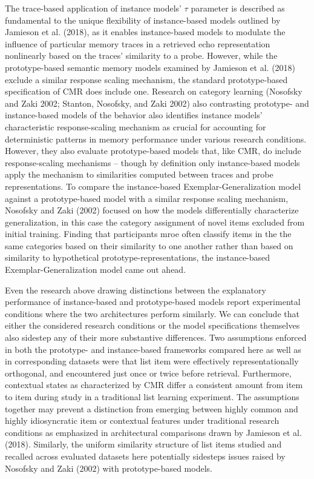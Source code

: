 \documentclass[
  letterpaper,
  DIV=11]{article}
\begin{document}
The trace-based application of instance models' \(\tau\) parameter is
described as fundamental to the unique flexibility of instance-based
models outlined by Jamieson et al. (2018), as it enables instance-based
models to modulate the influence of particular memory traces in a
retrieved echo representation nonlinearly based on the traces'
similarity to a probe. However, while the prototype-based semantic
memory models examined by Jamieson et al. (2018) exclude a similar
response scaling mechanism, the standard prototype-based specification
of CMR does include one. Research on category learning (Nosofsky and
Zaki 2002; Stanton, Nosofsky, and Zaki 2002) also contrasting prototype-
and instance-based models of the behavior also identifies instance
models' characteristic response-scaling mechanism as crucial for
accounting for deterministic patterns in memory performance under
various research conditions. However, they also evaluate prototype-based
models that, like CMR, do include response-scaling mechanisms -- though
by definition only instance-based models apply the mechanism to
similarities computed between traces and probe representations. To
compare the instance-based Exemplar-Generalization model against a
prototype-based model with a similar response scaling mechanism,
Nosofsky and Zaki (2002) focused on how the models differentially
characterize generalization, in this case the category assignment of
novel items excluded from initial training. Finding that participants
mroe often classify items in the the same categories based on their
similarity to one another rather than based on similarity to
hypothetical prototype-representations, the instance-based
Exemplar-Generalization model came out ahead.

Even the research above drawing distinctions between the explanatory
performance of instance-based and prototype-based models report
experimental conditions where the two architectures perform similarly.
We can conclude that either the considered research conditions or the
model specifications themselves also sidestep any of their more
substantive differences. Two assumptions enforced in both the prototype-
and instance-based frameworks compared here as well as in corresponding
datasets were that list item were effectively representationally
orthogonal, and encountered just once or twice before retrieval.
Furthermore, contextual states as characterized by CMR differ a
consistent amount from item to item during study in a traditional list
learning experiment. The assumptions together may prevent a distinction
from emerging between highly common and highly idiosyncratic item or
contextual features under traditional research conditions as emphasized
in architectural comparisons drawn by Jamieson et al. (2018). Similarly,
the uniform similarity structure of list items studied and recalled
across evaluated datasets here potentially sidesteps issues raised by
Nosofsky and Zaki (2002) with prototype-based models.
\end{document}
